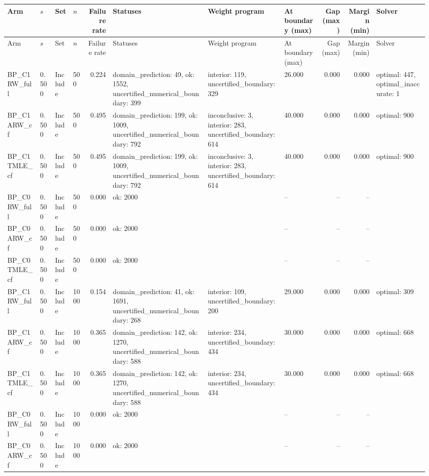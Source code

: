 \begin{tabular}{llllrlllrrl}
\hline
Arm & $s$ & Set & $n$ & Failure rate & Statuses & Weight program & At boundary (max) & Gap (max) & Margin (min) & Solver \\
\hline
\endfirsthead
\hline
Arm & $s$ & Set & $n$ & Failure rate & Statuses & Weight program & At boundary (max) & Gap (max) & Margin (min) & Solver \\
\hline
\endhead
BP\_C1 RW\_full & 0.500 & Include & 500 & 0.224 & domain\_prediction: 49, ok: 1552, uncertified\_numerical\_boundary: 399 & interior: 119, uncertified\_boundary: 329 & 26.000 & 0.000 & 0.000 & optimal: 447, optimal\_inaccurate: 1 \\
BP\_C1 ARW\_cf & 0.500 & Include & 500 & 0.495 & domain\_prediction: 199, ok: 1009, uncertified\_numerical\_boundary: 792 & inconclusive: 3, interior: 283, uncertified\_boundary: 614 & 40.000 & 0.000 & 0.000 & optimal: 900 \\
BP\_C1 TMLE\_cf & 0.500 & Include & 500 & 0.495 & domain\_prediction: 199, ok: 1009, uncertified\_numerical\_boundary: 792 & inconclusive: 3, interior: 283, uncertified\_boundary: 614 & 40.000 & 0.000 & 0.000 & optimal: 900 \\
BP\_C0 RW\_full & 0.500 & Include & 500 & 0.000 & ok: 2000 &  & -- & -- & -- &  \\
BP\_C0 ARW\_cf & 0.500 & Include & 500 & 0.000 & ok: 2000 &  & -- & -- & -- &  \\
BP\_C0 TMLE\_cf & 0.500 & Include & 500 & 0.000 & ok: 2000 &  & -- & -- & -- &  \\
BP\_C1 RW\_full & 0.500 & Include & 1000 & 0.154 & domain\_prediction: 41, ok: 1691, uncertified\_numerical\_boundary: 268 & interior: 109, uncertified\_boundary: 200 & 29.000 & 0.000 & 0.000 & optimal: 309 \\
BP\_C1 ARW\_cf & 0.500 & Include & 1000 & 0.365 & domain\_prediction: 142, ok: 1270, uncertified\_numerical\_boundary: 588 & interior: 234, uncertified\_boundary: 434 & 30.000 & 0.000 & 0.000 & optimal: 668 \\
BP\_C1 TMLE\_cf & 0.500 & Include & 1000 & 0.365 & domain\_prediction: 142, ok: 1270, uncertified\_numerical\_boundary: 588 & interior: 234, uncertified\_boundary: 434 & 30.000 & 0.000 & 0.000 & optimal: 668 \\
BP\_C0 RW\_full & 0.500 & Include & 1000 & 0.000 & ok: 2000 &  & -- & -- & -- &  \\
BP\_C0 ARW\_cf & 0.500 & Include & 1000 & 0.000 & ok: 2000 &  & -- & -- & -- &  \\

\end{tabular}
